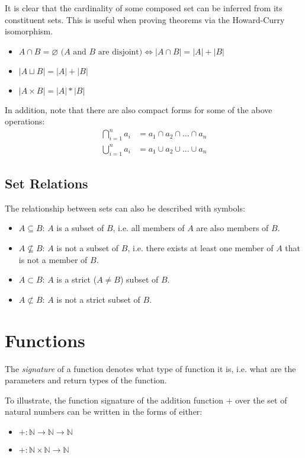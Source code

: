 \documentclass[12pt]{article}
\theoremstyle{definition}
\newcommand{\NN}{\mathbb{N}}
\begin{document}
	It is clear that the cardinality of some composed set can be inferred from its constituent sets. This is useful when proving theorems via the Howard-Curry isomorphism.
	\begin{itemize}
		\item $A \cap B = \varnothing \text{ ($A$ and $B$ are disjoint)} \iff |A \cap B| = |A| + |B|$
		\item $|A \sqcup B| = |A| + |B|$
		\item $|A \times B| = |A| * |B|$
	\end{itemize}
	
	In addition, note that there are also compact forms for some of the above operations:
	\begin{align*}
		\bigcap^n_{i=1} a_i &= a_1 \cap a_2 \cap \dots \cap a_n\\
		\bigcup^n_{i=1} a_i &= a_1 \cup a_2 \cup \dots \cup a_n
	\end{align*}
	
	\subsection{Set Relations}
	
	The relationship between sets can also be described with symbols:
	\begin{itemize}
		\item $A \subseteq B$: $A$ is a subset of $B$, i.e. all members of $A$ are also members of $B$.
		\item $A \not\subseteq B$: $A$ is not a subset of $B$, i.e. there exists at least one member of $A$ that is not a member of $B$.
		\item $A \subset B$: $A$ is a strict ($A \neq B$) subset of $B$.
		\item $A \not\subset B$: $A$ is not a strict subset of $B$.
 	\end{itemize}
 	
 	\section{Functions}
 	
 	The \emph{signature} of a function denotes what type of function it is, i.e. what are the parameters and return types of the function.
 	
 	To illustrate, the function signature of the addition function $+$ over the set of natural numbers can be written in the forms of either:
 	\begin{itemize}
 		\item $+ : \NN \to \NN \to \NN$
 		\item $+ : \NN \times \NN \to \NN$
 	\end{itemize}
 	
\end{document}
